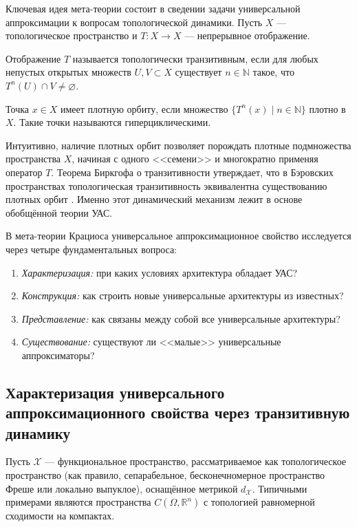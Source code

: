 \documentclass[../NDCNNAI_main.tex]{subfiles}
\begin{document}
Ключевая идея мета-теории состоит в сведении задачи универсальной аппроксимации
к вопросам топологической динамики.
Пусть $X$ --- топологическое пространство и $T\colon X\to X$ --- непрерывное отображение.

\begin{definition}
Отображение $T$ называется топологически транзитивным, если для любых непустых
открытых множеств $U,V\subset X$ существует $n\in\mathbb{N}$ такое, что
$T^n(U)\cap V\neq\varnothing$.
\end{definition}

\begin{definition}
Точка $x\in X$ имеет плотную орбиту, если множество
$\{T^n(x)\mid n\in\mathbb{N}\}$ плотно в $X$.
Такие точки называются гиперциклическими.
\end{definition}
\noindent
Интуитивно, наличие плотных орбит позволяет порождать плотные подмножества
пространства $X$, начиная с одного <<семени>> и многократно применяя оператор $T$.
Теорема Биркгофа о транзитивности утверждает, что в Бэровских пространствах
топологическая транзитивность эквивалентна существованию плотных орбит
\cite{Kratsios2021}.
Именно этот динамический механизм лежит в основе обобщённой теории УАС.

\begin{remark}
  В мета-теории Крациоса универсальное аппроксимационное свойство исследуется через четыре фундаментальных вопроса:
  \begin{enumerate}
    \item \emph{Характеризация:} при каких условиях архитектура обладает УАС?
    \item \emph{Конструкция:} как строить новые универсальные архитектуры из известных?
    \item \emph{Представление:} как связаны между собой все универсальные архитектуры?
    \item \emph{Существование:} существуют ли <<малые>> универсальные аппроксиматоры?
  \end{enumerate}
\end{remark}


\subsection{Характеризация универсального аппроксимационного свойства через транзитивную динамику}
Пусть $\mathcal{X}$ --- функциональное пространство, рассматриваемое как
топологическое пространство (как правило, сепарабельное, бесконечномерное
пространство Фреше или локально выпуклое), оснащённое метрикой $d_{\mathcal{X} }$.
Типичными примерами являются пространства $C(\Omega,\mathbb{R}^n)$ с топологией
равномерной сходимости на компактах.
\end{document}
